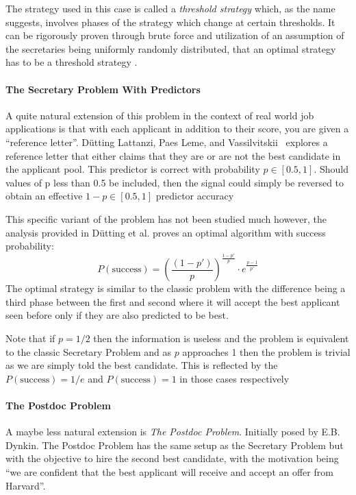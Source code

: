 \documentclass[a4paper,11pt]{article}
\begin{document}
The strategy used in this case is called a \textit{threshold strategy} which, as the name suggests, involves phases of the strategy which change at certain thresholds. It can be rigorously proven through brute force and utilization of an assumption of the secretaries being uniformly randomly distributed, that an optimal strategy has to be a threshold strategy \cite{bayon2017bestorworstpostdocproblems}.

\paragraph{The Secretary Problem With Predictors}

A quite natural extension of this problem in the context of real world job applications is that with each applicant in addition to their score, you are given a ``reference letter''. D\"utting Lattanzi, Paes Leme, and Vassilvitskii~\cite{dütting2020secretariesadvice} explores a reference letter that either claims that they are or are not the best candidate in the applicant pool. This predictor is correct with probability $p \in [0.5,1]$. Should values of p less than 0.5 be included, then the signal could simply be reversed to obtain an effective $1-p \in [0.5,1]$ predictor accuracy

This specific variant of the problem has not been studied much however, the analysis provided in D\"utting et al.\cite{dütting2020secretariesadvice} proves an optimal algorithm with success probability: $$P(\text{success}) = \left(\frac{\left(1-p'\right)}{p}\right)^{\frac{1-p' }{p}}\cdot e^{ \frac{p- 1}{p'} }$$ The optimal strategy is similar to the classic problem with the difference being a third phase between the first and second where it will accept the best applicant seen before only if they are also predicted to be best.  

Note that if $p = 1/2$ then the information is useless and the problem is equivalent to the classic Secretary Problem and as $ p $ approaches 1 then the problem is trivial as we are simply told the best candidate. This is reflected by the $P(\text{success}) = 1/e$ and $P(\text{success}) = 1$ in those cases respectively

\paragraph{The Postdoc Problem}

A maybe less natural extension is \textit{The Postdoc Problem}. Initially posed by E.B. Dynkin. The Postdoc Problem has the same setup as the Secretary Problem but with the objective to hire the second best candidate, with the motivation being ``we are confident that the best applicant will receive and accept an offer from Harvard''.
\end{document}
